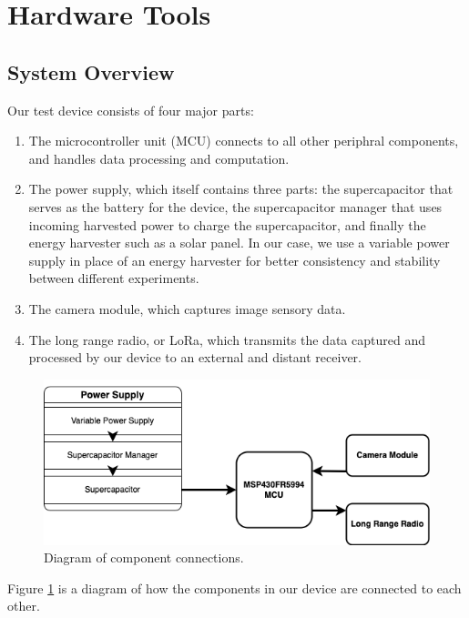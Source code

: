 \documentclass[twoside]{report}
\begin{document}
\section{Hardware Tools}
\subsection{System Overview} \label{overview}
Our test device consists of four major parts:
\begin{enumerate}
    \item The microcontroller unit (MCU) connects to all other periphral components, 
          and handles data processing and computation.
    \item The power supply, which itself contains three parts: the supercapacitor that serves 
          as the battery for the device, the supercapacitor manager that uses incoming harvested 
          power to charge the supercapacitor, and finally the energy harvester such as a solar panel. 
          In our case, we use a variable power supply in place of an energy harvester for better 
          consistency and stability between different experiments.
    \item The camera module, which captures image sensory data.
    \item The long range radio, or LoRa, which transmits the data captured and processed by our device 
          to an external and distant receiver.
\end{enumerate}

\begin{figure}[ht]
    \centering
    \includegraphics[width=0.8\linewidth]{method/3.1.png}
    \caption{Diagram of component connections.}
    \label{fig:connection}
\end{figure}

Figure \ref{fig:connection} is a diagram of how the components in our device are connected to each other. 
\end{document}
